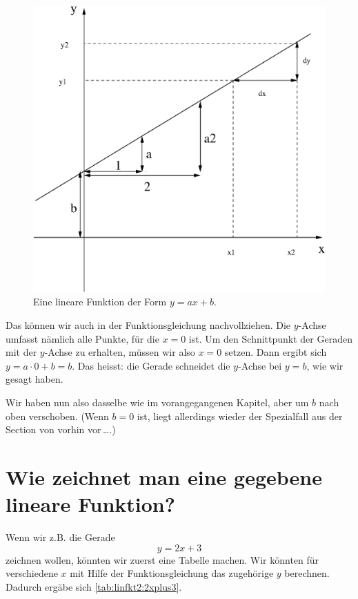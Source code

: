 \documentclass[%
11pt,%
twoside,%
titlepage,%
german,%
headsepline%
]{scrartcl}
\begin{document}
{\begin{figure}[b!]
  \centering
          
  \includegraphics[width=0.8\columnwidth]{pictures/axplusb.eps}
  \caption{Eine lineare Funktion der Form $y=ax+b$.}
  \label{fig:linfkt2:axplusb}
\end{figure}

Das k\"onnen wir auch in der Funktionsgleichung nachvollziehen. Die $y$-Achse umfasst n\"amlich alle Punkte, f\"ur die $x=0$ ist. Um den Schnittpunkt der Geraden mit der $y$-Achse zu erhalten, m\"ussen wir also $x=0$ setzen. Dann ergibt sich $y=a\cdot 0 + b = b$. Das heisst: die Gerade schneidet die $y$-Achse bei $y=b$, wie wir gesagt haben.

Wir haben nun also dasselbe wie im vorangegangenen Kapitel, aber um $b$ nach oben verschoben. (Wenn $b=0$ ist, liegt allerdings wieder der Spezialfall aus der Section von vorhin vor\,\ldots.)

\section{Wie zeichnet man eine gegebene lineare Funktion?}
\label{linfkt2:zeichnen}

Wenn wir z.B. die Gerade
\begin{displaymath}
  y = 2x + 3
\end{displaymath}
zeichnen wollen, k\"onnten wir zuerst eine Tabelle machen. Wir k\"onnten f\"ur verschiedene $x$ mit Hilfe der Funktionsgleichung das zugeh\"orige $y$ berechnen. Dadurch erg\"abe sich \ref{tab:linfkt2:2xplus3}.

}
\end{document}
